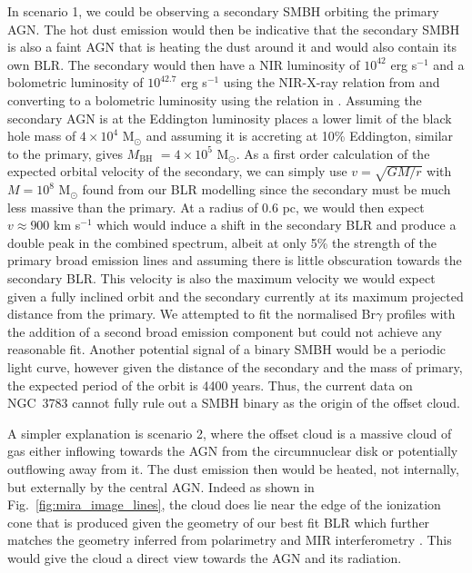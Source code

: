 \documentclass[longauth,]{aa}
\newcommand{\brg}{Br$\gamma$}
\newcommand{\mbh}{{\mbox{$M_\mathrm{BH}$}}}
\begin{document}
In scenario 1, we could be observing a secondary SMBH orbiting the primary AGN. The hot dust emission would then be indicative that the secondary SMBH is also a faint AGN that is heating the dust around it and would also contain its own BLR. The secondary would then have a NIR luminosity of $10^{42}$ erg s$^{-1}$ and a bolometric luminosity of $10^{42.7}$ erg s$^{-1}$ using the NIR-X-ray relation from \citet{Burtscher:2015lr} and converting to a bolometric luminosity using the relation in \citet{Winter:2012yq}. Assuming the secondary AGN is at the Eddington luminosity places a lower limit of the black hole mass of $4 \times 10^4$ M$_{\odot}$ and assuming it is accreting at 10\% Eddington, similar to the primary, gives \mbh{} $= 4\times10^5$ M$_{\odot}$. As a first order calculation of the expected orbital velocity of the secondary, we can simply use $v = \sqrt{GM/r}$ with $M = 10^{8}$ M$_{\odot}$ found from our BLR modelling since the secondary must be much less massive than the primary. At a radius of 0.6 pc, we would then expect $v \approx 900$ km s$^{-1}$ which would induce a shift in the secondary BLR and produce a double peak in the combined spectrum, albeit at only 5\% the strength of the primary broad emission lines and assuming there is little obscuration towards the secondary BLR. This velocity is also the maximum velocity we would expect given a fully inclined orbit and the secondary currently at its maximum projected distance from the primary. We attempted to fit the normalised \brg{} profiles with the addition of a second broad emission component but could not achieve any reasonable fit. Another potential signal of a binary SMBH would be a periodic light curve, however given the distance of the secondary and the mass of primary, the expected period of the orbit is 4400 years. Thus, the current data on NGC~3783 cannot fully rule out a SMBH binary as the origin of the offset cloud.

A simpler explanation is scenario 2, where the offset cloud is a massive cloud of gas either inflowing towards the AGN from the circumnuclear disk or potentially outflowing away from it. The dust emission then would be heated, not internally, but externally by the central AGN. Indeed as shown in Fig.~\ref{fig:mira_image_lines}, the cloud does lie near the edge of the ionization cone that is produced given the geometry of our best fit BLR which further matches the geometry inferred from polarimetry \citep{lira20} and MIR interferometry \citep{Honig:2013qy}. This would give the cloud a direct view towards the AGN and its radiation.
\end{document}

